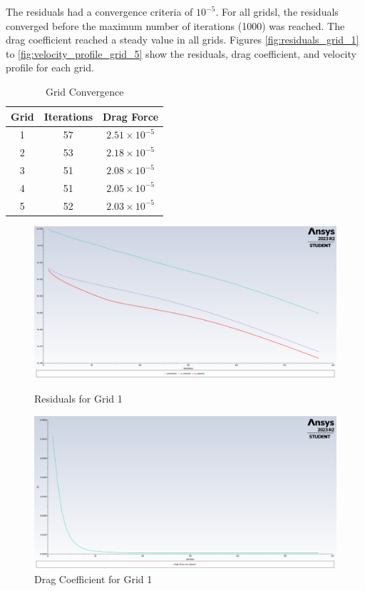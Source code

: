 The residuals had a convergence criteria of $10^{-5}$. For all gridsl, the residuals converged before the maximum number of iterations (1000) was reached. The drag coefficient reached a steady value in all grids. Figures \ref{fig:residuals_grid_1} to \ref{fig:velocity_profile_grid_5} show the residuals, drag coefficient, and velocity profile for each grid.
\begin{table}[h]
    \centering
    \caption{Grid Convergence}
    \label{tab:grid_convergence}
    \begin{tabular}{ccc}
        \toprule
        Grid & Iterations & Drag Force \\
        \midrule
        1 & 57 & $2.51 \times 10^{-5}$ \\
        2 & 53 & $2.18 \times 10^{-5}$ \\
        3 & 51 & $2.08 \times 10^{-5}$ \\
        4 & 51 & $2.05 \times 10^{-5}$ \\
        5 & 52 & $2.03 \times 10^{-5}$ \\
        \bottomrule
    \end{tabular}
\end{table}
\begin{figure}[H]
    \centering
    \begin{minipage}{0.45\textwidth}
        \centering
        \includegraphics[width=\textwidth]{Questions/Figures/residuals grid 1.png}
        \caption{Residuals for Grid 1}
        \label{fig:residuals_grid_1}
    \end{minipage}
    \begin{minipage}{0.45\textwidth}
        \centering
        \includegraphics[width=\textwidth]{Questions/Figures/drag force on square grid 1.png}
        \caption{Drag Coefficient for Grid 1}
        \label{fig:drag_coefficient_grid_1}
    \end{minipage}
\end{figure}
